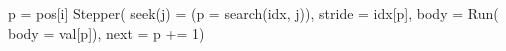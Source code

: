 \begin{juliacode}
p = pos[i]
Stepper(
  seek(j) = (p = search(idx, j)),
  stride = idx[p],
  body = Run(
    body = val[p]),
  next = p += 1)
\end{juliacode}